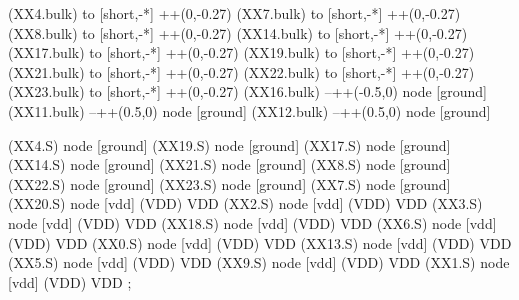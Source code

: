 \begin{circuitikz}[american]
	(XX4.bulk) to [short,-*] ++(0,-0.27)
	(XX7.bulk) to [short,-*] ++(0,-0.27)
	(XX8.bulk) to [short,-*] ++(0,-0.27)
	(XX14.bulk) to [short,-*] ++(0,-0.27)
	(XX17.bulk) to [short,-*] ++(0,-0.27)
	(XX19.bulk) to [short,-*] ++(0,-0.27)
	(XX21.bulk) to [short,-*] ++(0,-0.27)
	(XX22.bulk) to [short,-*] ++(0,-0.27)
	(XX23.bulk) to [short,-*] ++(0,-0.27)
	(XX16.bulk) --++(-0.5,0) node [ground] {}
	(XX11.bulk) --++(0.5,0) node [ground] {}
	(XX12.bulk) --++(0.5,0) node [ground] {}


	(XX4.S) node [ground] {}
	(XX19.S) node [ground] {}
	(XX17.S) node [ground] {}
	(XX14.S) node [ground] {}
	(XX21.S) node [ground] {}
	(XX8.S) node [ground] {}
	(XX22.S) node [ground] {}
	(XX23.S) node [ground] {}
	(XX7.S) node [ground] {}
	(XX20.S) node [vdd] (VDD) {VDD}
	(XX2.S) node [vdd] (VDD) {VDD}
	(XX3.S) node [vdd] (VDD) {VDD}
	(XX18.S) node [vdd] (VDD) {VDD}
	(XX6.S) node [vdd] (VDD) {VDD}
	(XX0.S) node [vdd] (VDD) {VDD}
	(XX13.S) node [vdd] (VDD) {VDD}
	(XX5.S) node [vdd] (VDD) {VDD}
	(XX9.S) node [vdd] (VDD) {VDD}
	(XX1.S) node [vdd] (VDD) {VDD}
;

\end{circuitikz}
